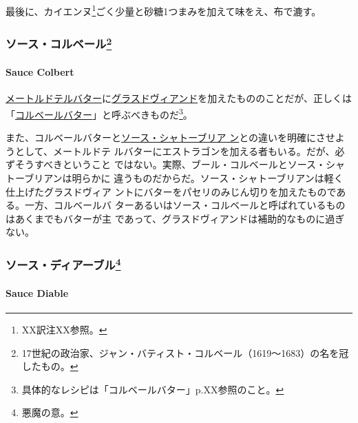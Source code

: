 \documentclass[twoside,12Q,b5j]{escoffierltjsbook}
\newenvironment{recette}{\begin{small}\begin{spacing}{1}\begin{multicols}{2}}{\end{multicols}\end{spacing}\end{small}}
\begin{document}
\begin{recette}
最後に、カイエンヌ\footnote{XX訳注XX参照。}ごく少量と砂糖1つまみを加えて味をえ、布で漉す。

\vspace*{1.7\zw}

\subsubsection[ソース・コルベール]{\texorpdfstring{ソース・コルベール\footnote{17世紀の政治家、ジャン・バティスト・コルベール（1619〜1683）の名を冠したもの。}}{ソース・コルベール}}\label{ux30bdux30fcux30b9ux30b3ux30ebux30d9ux30fcux30eb23}

\paragraph{Sauce Colbert}\label{sauce-colbert}


\protect\hyperlink{beurre-a-la-maitre-d-hotel}{メートルドテルバター}に\protect\hyperlink{glace-de-viande}{グラスドヴィアンド}を加えたもののことだが、正しくは「\protect\hyperlink{beurre-colbert}{コルベールバター}」と呼ぶべきものだ\footnote{具体的なレシピは「コルベールバター」p.XX参照のこと。}。

また、コルベールバターと\protect\hyperlink{sauce-chateaubriand}{ソース・シャトーブリア
ン}との違いを明確にさせようとして、メートルドテ
ルバターにエストラゴンを加える者もいる。だが、必ずそうすべきということ
ではない。実際、ブール・コルベールとソース・シャトーブリアンは明らかに
違うものだからだ。ソース・シャトーブリアンは軽く仕上げたグラスドヴィア
ントにバターをパセリのみじん切りを加えたものである。一方、コルベールバ
ターあるいはソース・コルベールと呼ばれているものはあくまでもバターが主
であって、グラスドヴィアンドは補助的なものに過ぎない。

\vspace*{1.7\zw}

\subsubsection[ソース・ディアーブル]{\texorpdfstring{ソース・ディアーブル\footnote{悪魔の意。}}{ソース・ディアーブル}}\label{ux30bdux30fcux30b9ux30c7ux30a3ux30a2ux30fcux30d6ux30eb25}

\paragraph{Sauce Diable}\label{sauce-diable}


\end{recette}
\end{document}
